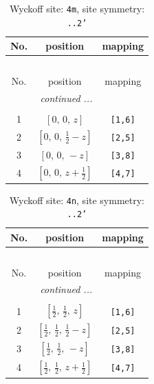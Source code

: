 \documentclass[fleqn,8pt]{jsarticle}
\begin{document}
\renewcommand{\arraystretch}{1.2}
\begin{longtable}{ccc}
\caption{Wyckoff site: {\tt 4m}, site symmetry: {\tt ..2'}}
 \\
 \hline \hline
No. & position & mapping \\ \hline \endfirsthead

\multicolumn{2}{l}{\tablename\ \thetable{}} \\
 \hline \hline
No. & position & mapping \\ \hline \endhead

 \hline \hline
\multicolumn{2}{r}{\footnotesize\it continued ...} \\ \endfoot

 \hline \hline
\multicolumn{2}{r}{} \\ \endlastfoot

1 & $\left[ 0,\, 0,\, z \right]$ & {\tt [1,6]} \\ \hline
2 & $\left[ 0,\, 0,\, \frac{1}{2} - z \right]$ & {\tt [2,5]} \\ \hline
3 & $\left[ 0,\, 0,\, - z \right]$ & {\tt [3,8]} \\ \hline
4 & $\left[ 0,\, 0,\, z + \frac{1}{2} \right]$ & {\tt [4,7]} \\
\end{longtable}
\renewcommand{\arraystretch}{1.2}
\begin{longtable}{ccc}
\caption{Wyckoff site: {\tt 4n}, site symmetry: {\tt ..2'}}
 \\
 \hline \hline
No. & position & mapping \\ \hline \endfirsthead

\multicolumn{2}{l}{\tablename\ \thetable{}} \\
 \hline \hline
No. & position & mapping \\ \hline \endhead

 \hline \hline
\multicolumn{2}{r}{\footnotesize\it continued ...} \\ \endfoot

 \hline \hline
\multicolumn{2}{r}{} \\ \endlastfoot

1 & $\left[ \frac{1}{2},\, \frac{1}{2},\, z \right]$ & {\tt [1,6]} \\ \hline
2 & $\left[ \frac{1}{2},\, \frac{1}{2},\, \frac{1}{2} - z \right]$ & {\tt [2,5]} \\ \hline
3 & $\left[ \frac{1}{2},\, \frac{1}{2},\, - z \right]$ & {\tt [3,8]} \\ \hline
4 & $\left[ \frac{1}{2},\, \frac{1}{2},\, z + \frac{1}{2} \right]$ & {\tt [4,7]} \\
\end{longtable}
\end{document}
